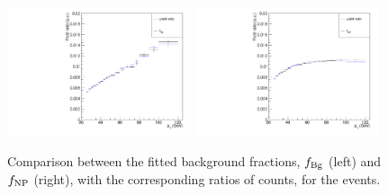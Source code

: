 \begin{figure}[h]
\centering
\includegraphics[width=0.48\textwidth]{Figures/chapter4/fitcomp_fSB.pdf}
\includegraphics[width=0.48\textwidth]{Figures/chapter4/fitcomp_fNP.pdf}
\caption{Comparison between the fitted background fractions,
$f_{\rm Bg}$ (left) and $f_{\rm NP}$ (right),
with the corresponding ratios of counts, for the \jpsi events.}
\label{fig:fractions_from_yields}
\end{figure}
